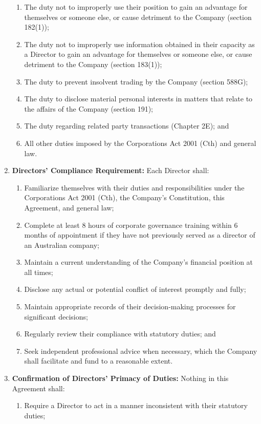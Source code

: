 \begin{enumerate}[label=(\alph*)]
\begin{enumerate}[label=(\roman*)]
    \item The duty not to improperly use their position to gain an advantage for themselves or someone else, or cause detriment to the Company (section 182(1));
    \item The duty not to improperly use information obtained in their capacity as a Director to gain an advantage for themselves or someone else, or cause detriment to the Company (section 183(1));
    \item The duty to prevent insolvent trading by the Company (section 588G);
    \item The duty to disclose material personal interests in matters that relate to the affairs of the Company (section 191);
    \item The duty regarding related party transactions (Chapter 2E); and
    \item All other duties imposed by the Corporations Act 2001 (Cth) and general law.
    \end{enumerate}
\item \textbf{Directors' Compliance Requirement:} Each Director shall:
    \begin{enumerate}[label=(\roman*)]
    \item Familiarize themselves with their duties and responsibilities under the Corporations Act 2001 (Cth), the Company's Constitution, this Agreement, and general law;
    \item Complete at least 8 hours of corporate governance training within 6 months of appointment if they have not previously served as a director of an Australian company;
    \item Maintain a current understanding of the Company's financial position at all times;
    \item Disclose any actual or potential conflict of interest promptly and fully;
    \item Maintain appropriate records of their decision-making processes for significant decisions;
    \item Regularly review their compliance with statutory duties; and
    \item Seek independent professional advice when necessary, which the Company shall facilitate and fund to a reasonable extent.
    \end{enumerate}
\item \textbf{Confirmation of Directors' Primacy of Duties:} Nothing in this Agreement shall:
    \begin{enumerate}[label=(\roman*)]
    \item Require a Director to act in a manner inconsistent with their statutory duties;

\end{enumerate}
\end{enumerate}
